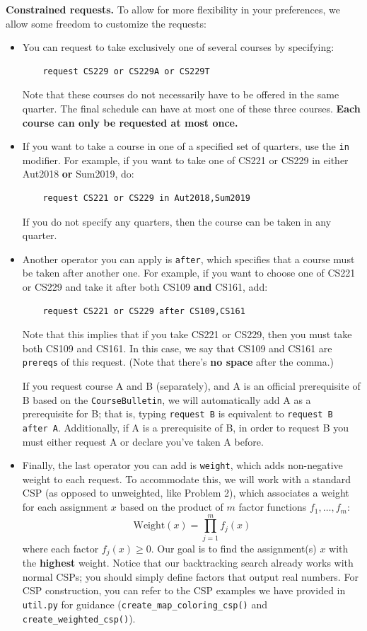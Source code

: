 \documentclass{article}
\theoremstyle{case}
\theoremstyle{definition}
\begin{document}
\textbf{Constrained requests.} To allow for more flexibility in your preferences, we allow some freedom to customize the requests:
\begin{itemize}
    \item You can request to take exclusively one of several courses by specifying:
    \begin{verbatim}
    request CS229 or CS229A or CS229T
    \end{verbatim}
    Note that these courses do not necessarily have to be offered in the same quarter. The final schedule can have at most one of these three courses. \textbf{Each course can only be requested at most once.}
    \item If you want to take a course in one of a specified set of quarters, use the \texttt{in} modifier. For example, if you want to take one of CS221 or CS229 in either Aut2018 \textbf{or} Sum2019, do:
    \begin{verbatim}
    request CS221 or CS229 in Aut2018,Sum2019
    \end{verbatim}
    If you do not specify any quarters, then the course can be taken in any quarter.
    \item Another operator you can apply is \texttt{after}, which specifies that a course must be taken after another one. For example, if you want to choose one of CS221 or CS229 and take it after both CS109 \textbf{and} CS161, add:
    \begin{verbatim}
    request CS221 or CS229 after CS109,CS161
    \end{verbatim}
    Note that this implies that if you take CS221 or CS229, then you must take both CS109 and CS161. In this case, we say that CS109 and CS161 are \texttt{prereqs} of this request. (Note that there's \textbf{no space} after the comma.)

    If you request course A and B (separately), and A is an official prerequisite of B based on the \texttt{CourseBulletin}, we will automatically add A as a prerequisite for B; that is, typing \texttt{request B} is equivalent to \texttt{request B after A}. Additionally, if A is a prerequisite of B, in order to request B you must either request A or declare you've taken A before.
    \item Finally, the last operator you can add is \texttt{weight}, which adds non-negative weight to each request. To accommodate this, we will work with a standard CSP (as opposed to unweighted, like Problem 2), which associates a weight for each assignment $x$ based on the product of $m$ factor functions $f_1, \dots, f_m$:
    $$\text{Weight}(x) = \prod^m_{j=1}f_j(x)$$
    where each factor $f_j(x)\geq 0$. Our goal is to find the assignment(s) $x$ with the \textbf{highest} weight. Notice that our backtracking search already works with normal CSPs; you should simply define factors that output real numbers. For CSP construction, you can refer to the CSP examples we have provided in \texttt{util.py} for guidance (\texttt{create\_map\_coloring\_csp()} and \texttt{create\_weighted\_csp()}).


\end{itemize}
\end{document}
